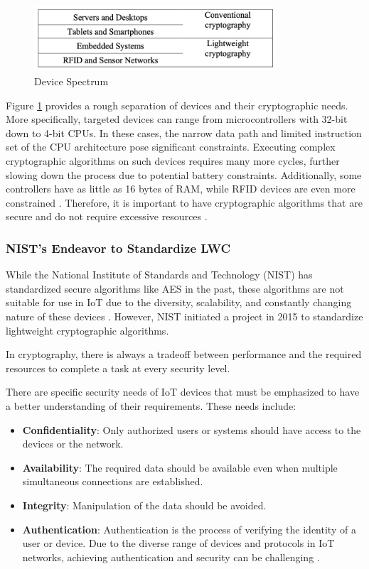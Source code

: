\begin{figure}[h]
    \centering
    \includegraphics[width=9.0cm, height=2.5cm]{media/device_spectrum.png}
    \caption{Device Spectrum}
    \label{fig:device_spectrum}
\end{figure}

Figure \ref{fig:device_spectrum} provides a rough separation of devices and their cryptographic needs. More specifically, targeted devices can range from microcontrollers with 32-bit down to 4-bit CPUs. In these cases, the narrow data path and limited instruction set of the CPU architecture pose significant constraints. Executing complex cryptographic algorithms on such devices requires many more cycles, further slowing down the process due to potential battery constraints. Additionally, some controllers have as little as 16 bytes of RAM, while RFID devices are even more constrained \cite{mckay2016report}. Therefore, it is important to have cryptographic algorithms that are secure and do not require excessive resources \cite{IOTMarkets} \cite{dhanda2020lightweight}.

\subsubsection{NIST's Endeavor to Standardize LWC}
While the National Institute of Standards and Technology (NIST) has standardized secure algorithms like AES in the past, these algorithms are not suitable for use in IoT due to the diversity, scalability, and constantly changing nature of these devices \cite{ekwueme2024lightweight}. However, NIST initiated a project in 2015 to standardize lightweight cryptographic algorithms.

In cryptography, there is always a tradeoff between performance and the required resources to complete a task at every security level.

There are specific security needs of IoT devices that must be emphasized to have a better understanding of their requirements. These needs include:

\begin{itemize}
    \setlength{\itemsep}{-5pt}
    \item \textbf{Confidentiality}: Only authorized users or systems should have access to the devices or the network.
    \item \textbf{Availability}: The required data should be available even when multiple simultaneous connections are established.
    \item \textbf{Integrity}: Manipulation of the data should be avoided.
    \item \textbf{Authentication}: Authentication is the process of verifying the identity of a user or device. Due to the diverse range of devices and protocols in IoT networks, achieving authentication and security can be challenging \cite{dutta2019lightweight} \cite{dhanda2020lightweight}.
\end{itemize}

